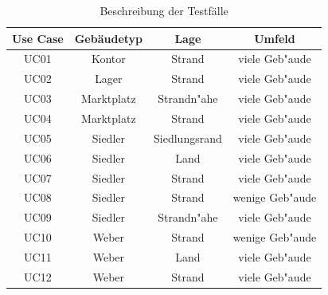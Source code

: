 \documentclass[%
			paper=a4,%
			DIV12,
			liststotoc,
			bibtotoc,
			draft=false,%
			titlepage,
			numbers=noendperiod
			]{scrartcl}
\begin{document}
\begin{table}[htpb]
\begin{center}
	\begin{tabular}{|c|c|c|c|}
		\hline
		Use Case & Gebäudetyp & Lage & Umfeld \\
		\hline

UC01 & Kontor & Strand & viele Geb"aude\\
UC02 & Lager & Strand & viele Geb"aude\\
UC03 & Marktplatz & Strandn"ahe & viele Geb"aude\\
UC04 & Marktplatz & Strand & viele Geb"aude\\
UC05 & Siedler & Siedlungsrand & viele Geb"aude\\
UC06 & Siedler & Land & viele Geb"aude\\
UC07 & Siedler & Strand & viele Geb"aude\\
UC08 & Siedler & Strand & wenige Geb"aude\\
UC09 & Siedler & Strandn"ahe & viele Geb"aude\\
UC10 & Weber & Strand & wenige Geb"aude\\
UC11 & Weber & Land & viele Geb"aude\\
UC12 & Weber & Strand & viele Geb"aude\\


		\hline
	\end{tabular}
	\caption{Beschreibung der Testfälle}
	\label{tab:usecases_cases}
\end{center}
\end{table}
\end{document}
